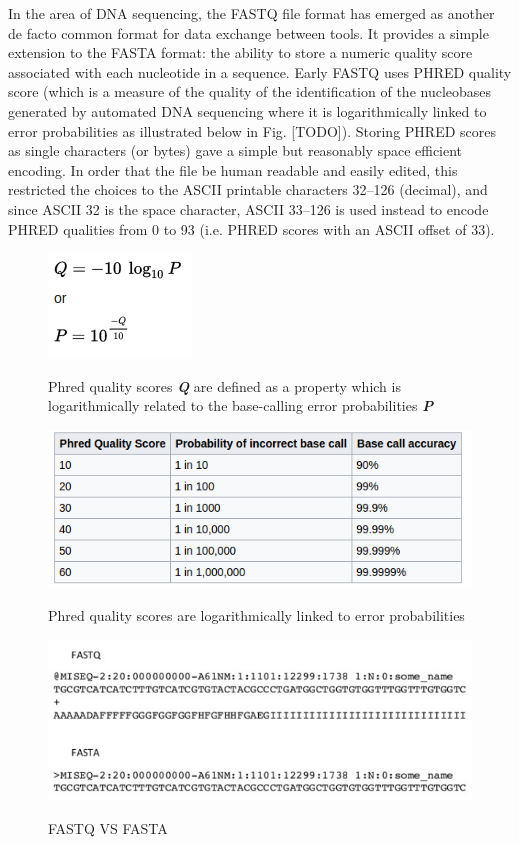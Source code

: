 \documentclass{llncs}
\begin{document}
In the area of DNA sequencing, the FASTQ file format has emerged as another de facto common format for data exchange between tools. It provides a simple extension to the FASTA format: the ability to store a numeric quality score associated with each nucleotide in a sequence. 
Early FASTQ uses PHRED quality score (which is a measure of the quality of the identification of the nucleobases generated by automated DNA sequencing where it is logarithmically linked to error probabilities as illustrated below in Fig. [TODO]). Storing PHRED scores as single characters (or bytes) gave a simple but reasonably space efficient encoding. In order that the file be human readable and easily edited, this restricted the choices to the ASCII printable characters 32–126 (decimal), and since ASCII 32 is the space character, ASCII 33–126 is used instead to encode PHRED qualities from 0 to 93 (i.e. PHRED scores with an ASCII offset of 33).


\begin{figure}
	\centering
	\includegraphics{./figs/NGS-3}
	\label{fig:fig4}
	\caption[caption]{Phred quality scores 
	\textit{\textbf{Q}} are defined as a property which is logarithmically related to the base-calling error probabilities \textit{\textbf{P}}}
\end{figure}
\begin{figure}
	\centering
	\includegraphics[width=.911\linewidth]{./figs/NGS-4}
	\label{fig:fig5}
	\caption[caption]{Phred quality scores are logarithmically linked to error probabilities}
\end{figure}

\begin{figure}
	\centering
	\includegraphics[width=.911\linewidth]{./figs/NGS-6}
	\label{fig:fig6}
	\caption[caption]{FASTQ VS FASTA}
\end{figure}
\end{document}
